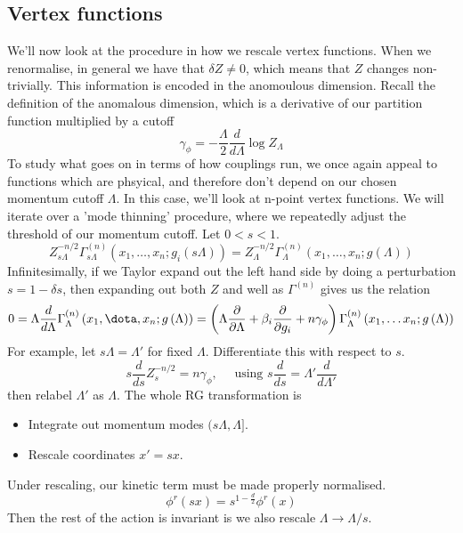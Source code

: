 \documentclass[11pt, oneside]{article}   	%
\theoremstyle{slanted}
\begin{document}
\subsection{Vertex functions}
We'll now look at the 
procedure in how we rescale vertex functions. 
When we renormalise, in general 
we have that $ \delta Z \neq 0 $, which means 
that $ Z $ changes non-trivially. 
This information is encoded in the anomoulous dimension. 
Recall the definition of 
the anomalous dimension, which is a derivative 
of our partition function multiplied by a cutoff
\[
\gamma _{ \phi  }  = - \frac{\Lambda }{ 2 } \frac{d }{ d \Lambda  } 
\log Z _{ \Lambda }
\] To study what goes on 
in terms of how couplings run, we 
once again appeal to 
functions which are phsyical, and 
therefore don't depend on our chosen momentum 
cutoff $ \Lambda  $. 
In this case, we'll look at n-point vertex functions. 
We will iterate 
over a 'mode thinning' procedure, where 
we repeatedly adjust the threshold of our momentum cutoff.  
Let $ 0 < s < 1 $.  
\[
Z _{ s \Lambda } ^{  - n / 2 } \Gamma 
_{ s \Lambda } ^{ \left( n  \right)  } \left( 
x _ 1 , \dots, x _ n ; g _ i \left( s \Lambda  \right)  \right)  
= Z _{ \Lambda } ^{  - n / 2 } \Gamma _{ \Lambda  }^{ \left( n  \right)  } 
\left( x _ 1, \dots , x_ n ; g \left(  \Lambda  \right)   \right)  
\] Infinitesimally, if we 
Taylor expand out the left hand side 
by doing a perturbation $ s =  1 - \delta s $, 
then expanding out both $ Z $ and well as 
$ \Gamma^{ \left( n  \right)  }  $ gives 
us the relation 
\[
0 = \Lambda \frac{ d  }{ d \Lambda } \Gamma _{ \Lambda } ^{ \left( n  \right)  } 
\left(  x _ 1 , \dota , x _ n ; g \left( \Lambda  \right)   \right)  
 = \left( \Lambda \frac{\partial  }{\partial  \Lambda }  + 
 \beta _ i  \frac{\partial  }{\partial  g _ i }  + n \gamma _ \phi  \right) 
 \Gamma _{ \Lambda } ^{ \left( n  \right)  } \left( x _ 1 , \dots 
 x_ n ; g \left(  \Lambda  \right)  \right) 
\] For example, 
let $ s \Lambda  = \Lambda ' $ for fixed $ \Lambda  $. 
Differentiate this with respect to $ s $. 
\[
s \frac{ d }{ds  } Z _ s ^{  - n / 2 }  = n \gamma _{ \phi } , \quad \text{ using }
s \frac{ d  }{ ds }   = \Lambda  ' \frac{ d }{ d \Lambda   '}
\] then relabel $ \Lambda  ' $ as $ \Lambda $. 
The whole RG transformation 
is
\begin{itemize}
\item Integrate out momentum modes $ ( s \Lambda , \Lambda  ] $. 
\item Rescale coordinates  $ x  ' = s  x $. 
\end{itemize}
Under rescaling, our kinetic 
term must be made properly normalised. 
\[
\phi ^ r \left( s x  \right)   = s ^{1 - \frac{d}{2 } } \phi ^ r (x) 
\] Then the rest of the action is invariant 
is we also rescale $ \Lambda \to \Lambda / s $.
\end{document}
